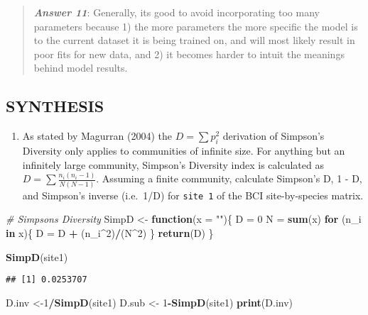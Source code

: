 \documentclass[
]{article}
\newenvironment{Shaded}{\begin{snugshade}}{\end{snugshade}}
\newcommand{\AttributeTok}[1]{\textcolor[rgb]{0.13,0.29,0.53}{#1}}
\newcommand{\CommentTok}[1]{\textcolor[rgb]{0.56,0.35,0.01}{\textit{#1}}}
\newcommand{\ControlFlowTok}[1]{\textcolor[rgb]{0.13,0.29,0.53}{\textbf{#1}}}
\newcommand{\DecValTok}[1]{\textcolor[rgb]{0.00,0.00,0.81}{#1}}
\newcommand{\FunctionTok}[1]{\textcolor[rgb]{0.13,0.29,0.53}{\textbf{#1}}}
\newcommand{\NormalTok}[1]{#1}
\newcommand{\OtherTok}[1]{\textcolor[rgb]{0.56,0.35,0.01}{#1}}
\newcommand{\SpecialCharTok}[1]{\textcolor[rgb]{0.81,0.36,0.00}{\textbf{#1}}}
\newcommand{\StringTok}[1]{\textcolor[rgb]{0.31,0.60,0.02}{#1}}
\providecommand{\tightlist}{%
  \setlength{\itemsep}{0pt}\setlength{\parskip}{0pt}}
\begin{document}
\begin{quote}
\textbf{\emph{Answer 11}}: Generally, its good to avoid incorporating
too many parameters because 1) the more parameters the more specific the
model is to the current dataset it is being trained on, and will most
likely result in poor fits for new data, and 2) it becomes harder to
intuit the meanings behind model results.
\end{quote}

\subsection{SYNTHESIS}\label{synthesis}

\begin{enumerate}
\def\labelenumi{\arabic{enumi}.}
\tightlist
\item
  As stated by Magurran (2004) the \({D = } \sum p_i^2\) derivation of
  Simpson's Diversity only applies to communities of infinite size. For
  anything but an infinitely large community, Simpson's Diversity index
  is calculated as \({D = } \sum \frac{n_i(n_i -1)} {N(N-1)}\). Assuming
  a finite community, calculate Simpson's D, 1 - D, and Simpson's
  inverse (i.e.~1/D) for \texttt{site\ 1} of the BCI site-by-species
  matrix.
\end{enumerate}

\begin{Shaded}
\begin{Highlighting}[]
\CommentTok{\# Simpson\textquotesingle{}s Diversity}
\NormalTok{SimpD }\OtherTok{\textless{}{-}} \ControlFlowTok{function}\NormalTok{(}\AttributeTok{x =} \StringTok{""}\NormalTok{)\{}
\NormalTok{  D }\OtherTok{=} \DecValTok{0}
\NormalTok{  N }\OtherTok{=} \FunctionTok{sum}\NormalTok{(x)}
  \ControlFlowTok{for}\NormalTok{ (n\_i }\ControlFlowTok{in}\NormalTok{ x)\{}
\NormalTok{    D }\OtherTok{=}\NormalTok{ D }\SpecialCharTok{+}\NormalTok{ (n\_i}\SpecialCharTok{\^{}}\DecValTok{2}\NormalTok{)}\SpecialCharTok{/}\NormalTok{(N}\SpecialCharTok{\^{}}\DecValTok{2}\NormalTok{)}
\NormalTok{  \}}
  \FunctionTok{return}\NormalTok{(D)}
\NormalTok{\}}

\FunctionTok{SimpD}\NormalTok{(site1)}
\end{Highlighting}
\end{Shaded}

\begin{verbatim}
## [1] 0.0253707
\end{verbatim}

\begin{Shaded}
\begin{Highlighting}[]
\NormalTok{D.inv }\OtherTok{\textless{}{-}}\DecValTok{1}\SpecialCharTok{/}\FunctionTok{SimpD}\NormalTok{(site1)}
\NormalTok{D.sub }\OtherTok{\textless{}{-}} \DecValTok{1}\SpecialCharTok{{-}}\FunctionTok{SimpD}\NormalTok{(site1)}
\FunctionTok{print}\NormalTok{(D.inv)}
\end{Highlighting}
\end{Shaded}
\end{document}
